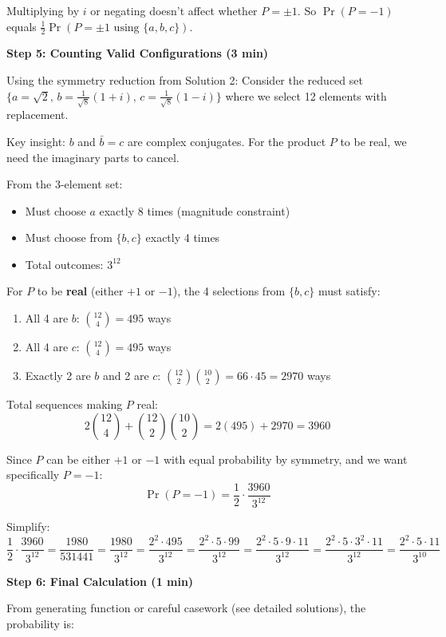 \documentclass[]{article}
\begin{document}
\begin{solutionbox}
Multiplying by $i$ or negating doesn't affect whether $P = \pm 1$. So $\Pr(P = -1)$ equals $\frac{1}{2} \Pr(P = \pm 1 \text{ using } \{a,b,c\})$.

\textbf{Step 5: Counting Valid Configurations (3 min)}

Using the symmetry reduction from Solution 2: Consider the reduced set $\{a= \sqrt{2},\, b=\frac{1}{\sqrt{8}}(1+i),\, c=\frac{1}{\sqrt{8}}(1-i)\}$ where we select 12 elements with replacement.

Key insight: $b$ and $\bar{b}=c$ are complex conjugates. For the product $P$ to be real, we need the imaginary parts to cancel.

From the 3-element set:
\begin{itemize}
    \item Must choose $a$ exactly 8 times (magnitude constraint)
    \item Must choose from $\{b, c\}$ exactly 4 times
    \item Total outcomes: $3^{12}$
\end{itemize}

For $P$ to be \textbf{real} (either $+1$ or $-1$), the 4 selections from $\{b,c\}$ must satisfy:
\begin{enumerate}
    \item All 4 are $b$: $\binom{12}{4} = 495$ ways
    \item All 4 are $c$: $\binom{12}{4} = 495$ ways
    \item Exactly 2 are $b$ and 2 are $c$: $\binom{12}{2}\binom{10}{2} = 66 \cdot 45 = 2970$ ways
\end{enumerate}

Total sequences making $P$ real: 
\[2\binom{12}{4} + \binom{12}{2}\binom{10}{2} = 2(495) + 2970 = 3960\]

Since $P$ can be either $+1$ or $-1$ with equal probability by symmetry, and we want specifically $P = -1$:
\[\Pr(P = -1) = \frac{1}{2} \cdot \frac{3960}{3^{12}}\]

Simplify:
\[\frac{1}{2} \cdot \frac{3960}{3^{12}} = \frac{1980}{531441} = \frac{1980}{3^{12}} = \frac{2^2 \cdot 495}{3^{12}} = \frac{2^2 \cdot 5 \cdot 99}{3^{12}} = \frac{2^2 \cdot 5 \cdot 9 \cdot 11}{3^{12}} = \frac{2^2 \cdot 5 \cdot 3^2 \cdot 11}{3^{12}} = \frac{2^2 \cdot 5 \cdot 11}{3^{10}}\]

\textbf{Step 6: Final Calculation (1 min)}

From generating function or careful casework (see detailed solutions), the probability is:


\end{solutionbox}
\end{document}
